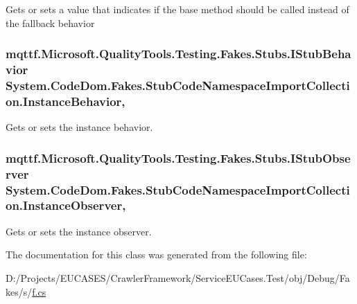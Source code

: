 Gets or sets a value that indicates if the base method should be called instead of the fallback behavior

\hypertarget{class_system_1_1_code_dom_1_1_fakes_1_1_stub_code_namespace_import_collection_a26a2ffcbaf1e9f0f57be5593e3d33202}{
\subsubsection[{Instance\-Behavior}]{\setlength{\rightskip}{0pt plus 5cm}mqttf.\-Microsoft.\-Quality\-Tools.\-Testing.\-Fakes.\-Stubs.\-I\-Stub\-Behavior System.\-Code\-Dom.\-Fakes.\-Stub\-Code\-Namespace\-Import\-Collection.\-Instance\-Behavior\hspace{0.3cm}{\ttfamily [get]}, {\ttfamily [set]}}}\label{class_system_1_1_code_dom_1_1_fakes_1_1_stub_code_namespace_import_collection_a26a2ffcbaf1e9f0f57be5593e3d33202}


Gets or sets the instance behavior.

\hypertarget{class_system_1_1_code_dom_1_1_fakes_1_1_stub_code_namespace_import_collection_a5428a04d1dac7ec8a672f59db729e37a}{
\subsubsection[{Instance\-Observer}]{\setlength{\rightskip}{0pt plus 5cm}mqttf.\-Microsoft.\-Quality\-Tools.\-Testing.\-Fakes.\-Stubs.\-I\-Stub\-Observer System.\-Code\-Dom.\-Fakes.\-Stub\-Code\-Namespace\-Import\-Collection.\-Instance\-Observer\hspace{0.3cm}{\ttfamily [get]}, {\ttfamily [set]}}}\label{class_system_1_1_code_dom_1_1_fakes_1_1_stub_code_namespace_import_collection_a5428a04d1dac7ec8a672f59db729e37a}


Gets or sets the instance observer.



The documentation for this class was generated from the following file\-:\begin{DoxyCompactItemize}
\item 
D\-:/\-Projects/\-E\-U\-C\-A\-S\-E\-S/\-Crawler\-Framework/\-Service\-E\-U\-Cases.\-Test/obj/\-Debug/\-Fakes/s/\hyperlink{s_2f_8cs}{f.\-cs}\end{DoxyCompactItemize}

